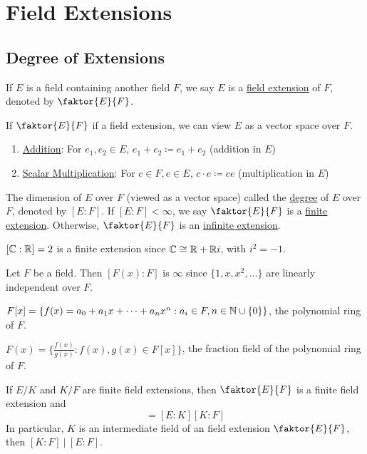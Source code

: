 \documentclass[11pt]{article}
\newcommand{\quotient}[2]{\faktor{#1}{#2}}
\begin{document}
\pagebreak
\section{Field Extensions}
\subsection{Degree of Extensions}
\begin{definition}
If $E$ is a field containing another field $F$, we say $E$ is a
\underline{field extension} of $F$, denoted by $\quotient EF$.
\end{definition}
If $\quotient{E}{F}$ if a field extension, we can view $E$ as a vector space
over $F$.
\begin{enumerate}
\item \underline{Addition}: For $e_1, e_2 \in E$, $e_1 + e_2 \coloneqq e_1 +
e_2$ (addition in $E$)
\item \underline{Scalar Multiplication}: For $c \in F, e \in E$, $c \cdot e
\coloneqq ce$ (multiplication in $E$)
\end{enumerate}
\begin{definition}
The dimension of $E$ over $F$ (viewed as a vector space) called the
\underline{degree} of $E$ over $F$, denoted by $[E:F]$. If $[E:F] < \infty$, we
say $\quotient EF$ is a \underline{finite extension}. Otherwise,
$\quotient{E}{F}$ is an \underline{infinite extension}.
\end{definition}
\begin{example}
$[\mathbb{C} : \mathbb{R}] = 2$ is a  finite extension since $\mathbb{C} \cong \mathbb{R} + \mathbb{R} i$, with $i^2 =
-1$.
\end{example}
\begin{example}
Let $F$ be a field. Then $[F(x) : F]$ is $\infty$ since $\{1, x, x^2, \dots\}$
are linearly independent over $F$.
\end{example}
\begin{remark}
$F[x] = \{f(x) = a_0 + a_1x + \dots + a_nx^n : a_i \in F, n \in \mathbb{N} \cup
\{0\}\}$, the polynomial ring of $F$.
\end{remark}
\begin{remark}
$F(x) = \{\frac{f(x)}{g(x)} : f(x), g(x) \in F[x]\}$, the fraction
field of the polynomial ring of $F$. 
\end{remark}
\begin{theorem} \label{theorem1}
If $E/K$ and $K/F$ are finite field extensions, then $\quotient{E}{F}$ is a
finite field extension and
\begin{equation*}
[E:F] = [E:K][K:F]
\end{equation*}
In particular, $K$ is an intermediate field of an field extension
$\quotient{E}{F}$, then $[K:F]\>\big|\> [E:F]$. 
\end{theorem}
\end{document}
